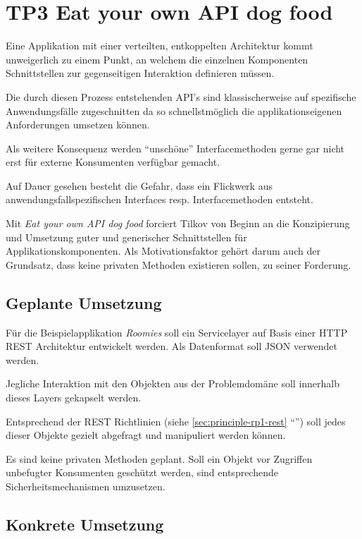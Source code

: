 \section{TP3 Eat your own API dog food}
\label{sec:principle-tp3-eat-your-own-api}

Eine Applikation mit einer verteilten, entkoppelten Architektur kommt unweigerlich zu einem Punkt, an welchem die einzelnen Komponenten Schnittstellen zur gegenseitigen Interaktion definieren müssen.

Die durch diesen Prozess entstehenden API's sind klassischerweise auf spezifische Anwendungsfälle zugeschnitten da so schnellstmöglich die applikationseigenen Anforderungen umsetzen können.

Als weitere Konsequenz werden ``unschöne'' Interfacemethoden gerne gar nicht erst für externe Konsumenten verfügbar gemacht.

Auf Dauer gesehen besteht die Gefahr, dass ein Flickwerk aus anwendungsfallspezifischen Interfaces resp. Interfacemethoden entsteht.

Mit \emph{Eat your own API dog food} forciert Tilkov von Beginn an die Konzipierung und Umsetzung guter und generischer Schnittstellen für Applikationskomponenten. Als Motivationsfaktor gehört darum auch der Grundsatz, dass keine privaten Methoden existieren sollen, zu seiner Forderung.


\subsection*{Geplante Umsetzung}

Für die Beispielapplikation \emph{Roomies} soll ein Servicelayer auf Basis einer HTTP \gls{REST} Architektur entwickelt werden. Als Datenformat soll \gls{JSON} verwendet werden.

Jegliche Interaktion mit den Objekten aus der Problemdomäne soll innerhalb dieses Layers gekapselt werden.

Entsprechend der \gls{REST} Richtlinien (siehe \ref{sec:principle-rp1-rest} ``'') soll jedes dieser Objekte gezielt abgefragt und manipuliert werden können.

Es sind keine privaten Methoden geplant. Soll ein Objekt vor Zugriffen unbefugter Konsumenten geschützt werden, sind entsprechende Sicherheitsmechanismen umzusetzen.


\subsection*{Konkrete Umsetzung}


